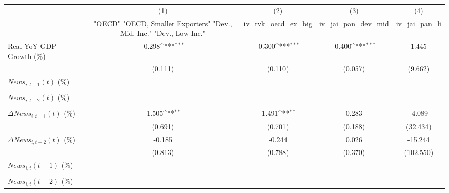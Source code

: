 {
\def\sym#1{\ifmmode^{#1}\else\(^{#1}\)\fi}
\begin{tabular}{l*{4}{c}}
\toprule
                    &\multicolumn{1}{c}{(1)}&\multicolumn{1}{c}{(2)}&\multicolumn{1}{c}{(3)}&\multicolumn{1}{c}{(4)}\\
                    &\multicolumn{1}{c}{ "OECD" "OECD, Smaller Exporters" "Dev., Mid.-Inc." "Dev., Low-Inc."}&\multicolumn{1}{c}{iv_rvk_oecd_ex_big}&\multicolumn{1}{c}{iv_jai_pan_dev_mid}&\multicolumn{1}{c}{iv_jai_pan_li}\\
\midrule
Real YoY GDP Growth (\%)&      -0.298\sym{***}&      -0.300\sym{***}&      -0.400\sym{***}&       1.445         \\
                    &     (0.111)         &     (0.110)         &     (0.057)         &     (9.662)         \\
\addlinespace
$ News_{i,t-1}(t)$ (\%)&                     &                     &                     &                     \\
                    &                     &                     &                     &                     \\
\addlinespace
$ News_{i,t-2}(t)$ (\%)&                     &                     &                     &                     \\
                    &                     &                     &                     &                     \\
\addlinespace
$ \Delta News_{i,t-1}(t)$ (\%)&      -1.505\sym{**} &      -1.491\sym{**} &       0.283         &      -4.089         \\
                    &     (0.691)         &     (0.701)         &     (0.188)         &    (32.434)         \\
\addlinespace
$ \Delta News_{i,t-2}(t)$ (\%)&      -0.185         &      -0.244         &       0.026         &     -15.244         \\
                    &     (0.813)         &     (0.788)         &     (0.370)         &   (102.550)         \\
\addlinespace
$ News_{i,t}(t+1)$ (\%)&                     &                     &                     &                     \\
                    &                     &                     &                     &                     \\
\addlinespace
$ News_{i,t}(t+2)$ (\%)&                     &                     &                     &                     \\

\end{tabular}}
